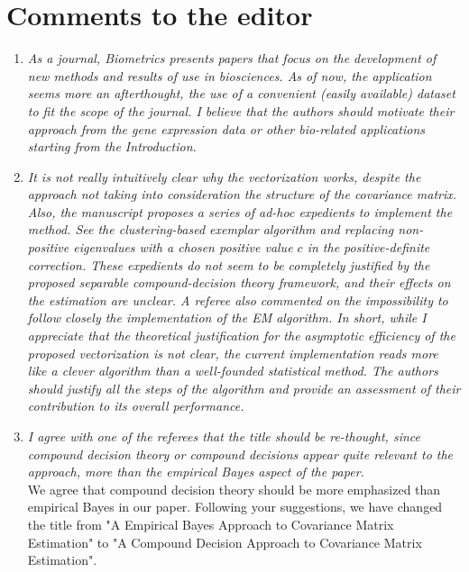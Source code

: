 \documentclass[12pt]{article}
\title{}
\begin{document}
\section{Comments to the editor}
\begin{enumerate}
\item \emph{As a journal, Biometrics presents papers that focus on the development of new methods and results of use in biosciences. As of now, the application seems more an afterthought, the use of a convenient (easily available) dataset to fit the scope of the journal. I believe that the authors should motivate their approach from the gene expression data or other bio-related applications starting from the Introduction.}
\item \emph{It is not really intuitively clear why the vectorization works, despite the approach not taking into consideration the structure of the covariance matrix. Also, the manuscript proposes a series of ad-hoc expedients to implement the method. See the clustering-based exemplar algorithm and replacing non-positive eigenvalues with a chosen positive value $c$ in the positive-definite correction. These expedients do not seem to be completely justified by the proposed separable compound-decision theory framework, and their effects on the estimation are unclear. A referee also commented on the impossibility to follow closely the implementation of the EM algorithm. In short, while I appreciate that the theoretical justification for the asymptotic efficiency of the proposed vectorization is not clear, the current implementation reads more like a clever algorithm than a well-founded statistical method. The authors should justify all the steps of the algorithm and provide an assessment of their contribution to its overall performance.}

\item \emph{I agree with one of the referees that the title should be re-thought, since compound decision theory or compound decisions appear quite relevant to the approach, more than the empirical Bayes aspect of the paper.}\\
We agree that compound decision theory should be more emphasized than empirical Bayes in our paper. Following your suggestions, we have changed the title from "A Empirical Bayes Approach to Covariance Matrix Estimation" to "A Compound Decision Approach to Covariance Matrix Estimation".


\end{enumerate}
\end{document}

